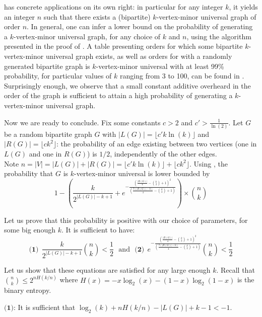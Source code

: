\documentclass[a4paper,UKenglish,cleveref, autoref, thm-restate]{arxiv}
\newcommand{\ls}{\leqslant}
\begin{document}
\begin{remark}
     has concrete applications on its own right: in particular for any integer $k$, it yields an integer $n$ such that there exists a (bipartite) $k$-vertex-minor universal graph of order $n$. In general, one can infer a lower bound on the probability of generating a $k$-vertex-minor universal graph, for any choice of $k$ and $n$, using the algorithm presented in the proof of . A table presenting orders for which some bipartite $k$-vertex-minor universal graph exists, as well as orders for with a randomly generated bipartite graph is $k$-vertex-minor universal with at least 99\% probability, for particular values of $k$ ranging from 3 to 100, can be found in . Surprisingly enough, we observe that a small constant additive overheard in the order of the graph is sufficient to attain a high probability of generating a $k$-vertex-minor universal graph.  
\end{remark}

Now we are ready to conclude. Fix some constants $c>2$ and $c'>\frac{1}{\ln(2)}$. Let $G$ be a random bipartite graph $G$ with $|L(G)| = \lfloor c'k\ln(k) \rfloor$ and $|R(G)| = \lfloor ck^2 \rfloor$: the probability of an edge existing between two vertices (one in $L(G)$ and one in $R(G)$) is $1/2$, independently of the other edges.\\

Note $n = |V| = |L(G)| + |R(G)| = \lfloor c'k\ln(k) \rfloor + \lfloor ck^2 \rfloor$. Using , the probability that $G$ is $k$-vertex-minor universal is lower bounded by $$  1 - \left( \frac{k}{2^{|L(G)|-k+1}} + e^{-\frac{\left(\frac{|R(G)|}{4}-{k \choose 2}+1\right)^2}{\left(\frac{7(|R(G)|-k)}{4}-{k \choose 2}+1\right)}}\right)\times {n \choose k} $$

Let us prove that this probability is positive with our choice of parameters, for some big enough $k$. It is sufficient to have: $$\textbf{(1)}~~  \frac{k}{2^{|L(G)|-k+1}}{n \choose k}< \dfrac{1}{2} \text{~~and~~} \textbf{(2)}~~ e^{-\frac{\left(\frac{|R(G)|}{4}-{k \choose 2}+1\right)^2}{\left(\frac{7(|R(G)|-k)}{4}-{k \choose 2}+1\right)}}{n \choose k}< \dfrac{1}{2} $$

Let us show that these equations are satisfied for any large enough $k$. Recall that ${n \choose k} \ls 2^{nH(k/n)}$ where $H(x) = -x\log_2(x)-(1-x)\log_2(1-x)$ is the binary entropy.

$\textbf{(1)}$: It is sufficient that $\log_2(k)+nH(k/n)-|L(G)|+k-1 < -1$. 
\end{document}
